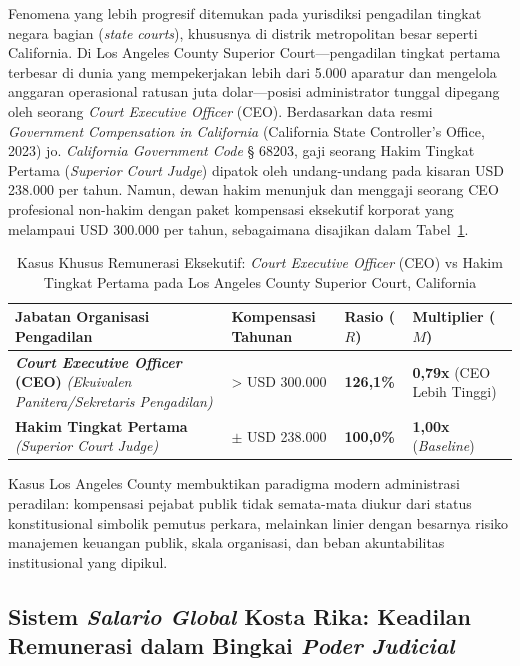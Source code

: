 \documentclass[12pt, a4paper]{article}
\begin{document}
Fenomena yang lebih progresif ditemukan pada yurisdiksi pengadilan tingkat negara bagian (\textit{state courts}), khususnya di distrik metropolitan besar seperti California. Di Los Angeles County Superior Court---pengadilan tingkat pertama terbesar di dunia yang mempekerjakan lebih dari 5.000 aparatur dan mengelola anggaran operasional ratusan juta dolar---posisi administrator tunggal dipegang oleh seorang \textit{Court Executive Officer} (CEO). Berdasarkan data resmi \textit{Government Compensation in California} (California State Controller's Office, 2023) jo. \textit{California Government Code} § 68203, gaji seorang Hakim Tingkat Pertama (\textit{Superior Court Judge}) dipatok oleh undang-undang pada kisaran USD 238.000 per tahun. Namun, dewan hakim menunjuk dan menggaji seorang CEO profesional non-hakim dengan paket kompensasi eksekutif korporat yang melampaui USD 300.000 per tahun, sebagaimana disajikan dalam Tabel~\ref{tab:komparasi-california-lengkap}.

\begin{table}[H]
\centering
\fontsize{9}{11}\selectfont
\caption{Kasus Khusus Remunerasi Eksekutif: \textit{Court Executive Officer} (CEO) vs Hakim Tingkat Pertama pada Los Angeles County Superior Court, California}
\label{tab:komparasi-california-lengkap}
\renewcommand{\arraystretch}{1.35}
\begin{tabular}{p{6.0cm} p{3.5cm} p{2.2cm} p{2.2cm}}
\hline
\textbf{Jabatan Organisasi Pengadilan} & \textbf{Kompensasi Tahunan} & \textbf{Rasio ($R$)} & \textbf{Multiplier ($M$)} \tabularnewline
\hline
\raggedright\textbf{\textit{Court Executive Officer} (CEO)} \newline \textit{(Ekuivalen Panitera/Sekretaris Pengadilan)} & > USD 300.000 & \textbf{126,1\%} & \textbf{0,79x} (CEO Lebih Tinggi) \tabularnewline
\raggedright\textbf{Hakim Tingkat Pertama} \newline \textit{(Superior Court Judge)} & $\pm$ USD 238.000 & \textbf{100,0\%} & \textbf{1,00x} (\textit{Baseline}) \tabularnewline
\hline
\end{tabular}
\end{table}

Kasus Los Angeles County membuktikan paradigma modern administrasi peradilan: kompensasi pejabat publik tidak semata-mata diukur dari status konstitusional simbolik pemutus perkara, melainkan linier dengan besarnya risiko manajemen keuangan publik, skala organisasi, dan beban akuntabilitas institusional yang dipikul.

\subsection{Sistem \textit{Salario Global} Kosta Rika: Keadilan Remunerasi dalam Bingkai \textit{Poder Judicial}}
\end{document}
